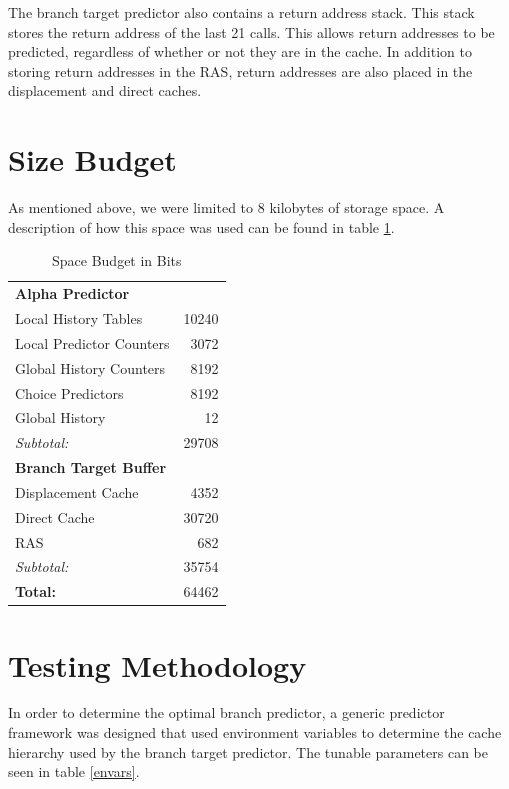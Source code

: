\documentclass[twocolumn]{article}
\begin{document}
The branch target predictor also contains a return address stack. This
stack stores the return address of the last 21 calls. This allows
return addresses to be predicted, regardless of whether or not they
are in the cache. In addition to storing return addresses in the RAS,
return addresses are also placed in the displacement and direct
caches.

\section{Size Budget}
As mentioned above, we were limited to 8 kilobytes of storage space. A
description of how this space was used can be found in table \ref{spaaace}. 


\begin{table}\begin{center}\begin{tabular}{lr}
\textbf{Alpha Predictor} & \\
Local History Tables & 10240 \\
Local Predictor Counters & 3072\\
Global History Counters & 8192\\
Choice Predictors & 8192\\
Global History & 12\\
\hline
\emph{Subtotal:} & 29708 \\
\textbf{Branch Target Buffer} & \\
Displacement Cache & 4352 \\
Direct Cache & 30720 \\
RAS & 682 \\
\hline
\emph{Subtotal:} & 35754 \\
\hline
\textbf{Total:} & 64462\\
\end{tabular}
\caption{Space Budget in Bits}
\label{spaaace}
\end{center}\end{table}


\section{Testing Methodology}

In order to determine the optimal branch predictor, a generic
predictor framework was designed that used environment variables to
determine the cache hierarchy used by the branch target predictor.
The tunable parameters can be seen in table \ref{envars}. 
\end{document}
